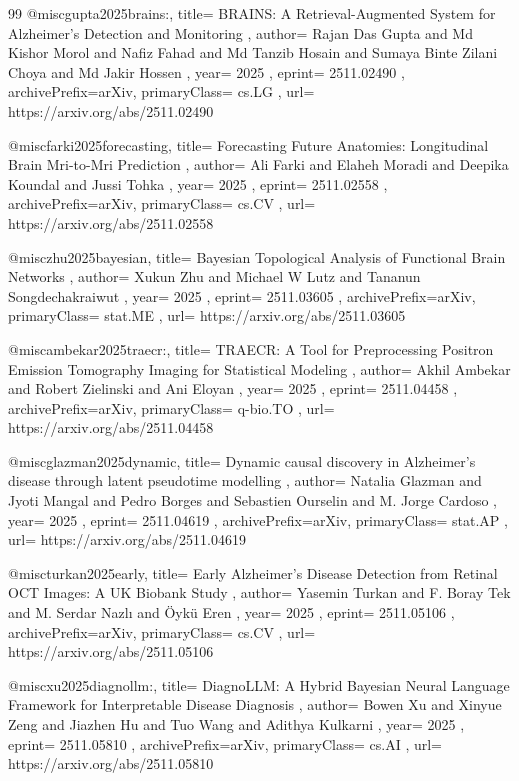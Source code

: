 \documentclass[11pt,a4paper]{article}
\begin{document}
\begin{thebibliography}{99}
@misc{gupta2025brains:,
  title={ BRAINS: A Retrieval-Augmented System for Alzheimer's Detection and Monitoring },
  author={ Rajan Das Gupta and Md Kishor Morol and Nafiz Fahad and Md Tanzib Hosain and Sumaya Binte Zilani Choya and Md Jakir Hossen },
  year={ 2025 },
  eprint={ 2511.02490 },
  archivePrefix={arXiv},
  primaryClass={ cs.LG },
  url={ https://arxiv.org/abs/2511.02490 }
}


@misc{farki2025forecasting,
  title={ Forecasting Future Anatomies: Longitudinal Brain Mri-to-Mri Prediction },
  author={ Ali Farki and Elaheh Moradi and Deepika Koundal and Jussi Tohka },
  year={ 2025 },
  eprint={ 2511.02558 },
  archivePrefix={arXiv},
  primaryClass={ cs.CV },
  url={ https://arxiv.org/abs/2511.02558 }
}


@misc{zhu2025bayesian,
  title={ Bayesian Topological Analysis of Functional Brain Networks },
  author={ Xukun Zhu and Michael W Lutz and Tananun Songdechakraiwut },
  year={ 2025 },
  eprint={ 2511.03605 },
  archivePrefix={arXiv},
  primaryClass={ stat.ME },
  url={ https://arxiv.org/abs/2511.03605 }
}


@misc{ambekar2025traecr:,
  title={ TRAECR: A Tool for Preprocessing Positron Emission Tomography Imaging for Statistical Modeling },
  author={ Akhil Ambekar and Robert Zielinski and Ani Eloyan },
  year={ 2025 },
  eprint={ 2511.04458 },
  archivePrefix={arXiv},
  primaryClass={ q-bio.TO },
  url={ https://arxiv.org/abs/2511.04458 }
}


@misc{glazman2025dynamic,
  title={ Dynamic causal discovery in Alzheimer's disease through latent pseudotime modelling },
  author={ Natalia Glazman and Jyoti Mangal and Pedro Borges and Sebastien Ourselin and M. Jorge Cardoso },
  year={ 2025 },
  eprint={ 2511.04619 },
  archivePrefix={arXiv},
  primaryClass={ stat.AP },
  url={ https://arxiv.org/abs/2511.04619 }
}


@misc{turkan2025early,
  title={ Early Alzheimer's Disease Detection from Retinal OCT Images: A UK Biobank Study },
  author={ Yasemin Turkan and F. Boray Tek and M. Serdar Nazlı and Öykü Eren },
  year={ 2025 },
  eprint={ 2511.05106 },
  archivePrefix={arXiv},
  primaryClass={ cs.CV },
  url={ https://arxiv.org/abs/2511.05106 }
}


@misc{xu2025diagnollm:,
  title={ DiagnoLLM: A Hybrid Bayesian Neural Language Framework for Interpretable Disease Diagnosis },
  author={ Bowen Xu and Xinyue Zeng and Jiazhen Hu and Tuo Wang and Adithya Kulkarni },
  year={ 2025 },
  eprint={ 2511.05810 },
  archivePrefix={arXiv},
  primaryClass={ cs.AI },
  url={ https://arxiv.org/abs/2511.05810 }
}



\end{thebibliography}
\end{document}
